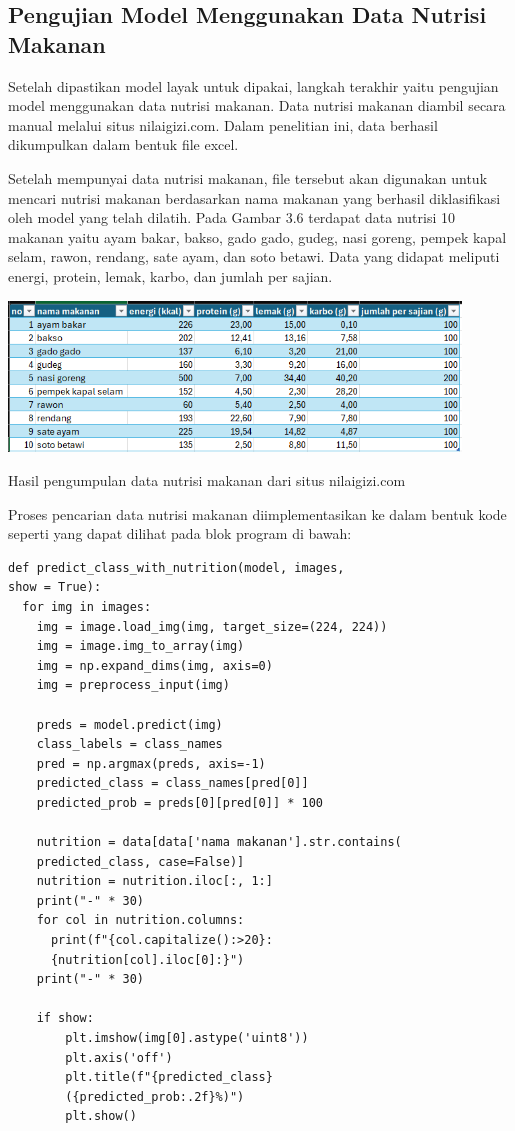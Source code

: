 \subsection{Pengujian Model Menggunakan Data Nutrisi Makanan}
Setelah dipastikan model layak untuk dipakai, langkah terakhir yaitu pengujian model menggunakan data nutrisi makanan. Data nutrisi makanan diambil secara manual melalui situs nilaigizi.com. Dalam penelitian ini, data berhasil dikumpulkan dalam bentuk file excel. 

Setelah mempunyai data nutrisi makanan, file tersebut akan digunakan untuk mencari nutrisi makanan berdasarkan nama makanan yang berhasil diklasifikasi oleh model yang telah dilatih. Pada Gambar 3.6 terdapat data nutrisi 10 makanan yaitu ayam bakar, bakso, gado gado, gudeg, nasi goreng, pempek kapal selam, rawon, rendang, sate ayam, dan soto betawi. Data yang didapat meliputi energi, protein, lemak, karbo, dan jumlah per sajian.

\begin{afigure}
    \includegraphics[width=0.9\textwidth, center]{images/data-nutrisi.png}
    \caption{Hasil pengumpulan data nutrisi makanan dari situs nilaigizi.com}
    \label{fig:data-nutrisi}
\end{afigure}

Proses pencarian data nutrisi makanan diimplementasikan ke dalam bentuk kode seperti yang dapat dilihat pada blok program di bawah:

\begin{lstlisting}[style=customc]
def predict_class_with_nutrition(model, images, 
show = True):
  for img in images:
    img = image.load_img(img, target_size=(224, 224))
    img = image.img_to_array(img)
    img = np.expand_dims(img, axis=0)
    img = preprocess_input(img)

    preds = model.predict(img)
    class_labels = class_names
    pred = np.argmax(preds, axis=-1)
    predicted_class = class_names[pred[0]]
    predicted_prob = preds[0][pred[0]] * 100

    nutrition = data[data['nama makanan'].str.contains(
    predicted_class, case=False)]
    nutrition = nutrition.iloc[:, 1:]
    print("-" * 30)
    for col in nutrition.columns:
      print(f"{col.capitalize():>20}: 
      {nutrition[col].iloc[0]:}")
    print("-" * 30)

    if show:
        plt.imshow(img[0].astype('uint8'))
        plt.axis('off')
        plt.title(f"{predicted_class} 
        ({predicted_prob:.2f}%)")
        plt.show()
\end{lstlisting}








